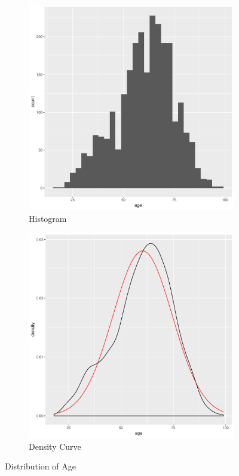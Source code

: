 \documentclass[11pt,openany]{book}
\begin{document}
\begin{figure}
        \centering
        \begin{subfigure}[b]{0.4\textwidth}
                \centering
                \includegraphics[width=\textwidth]{../03_Data/rskhist.pdf}%
                \caption{Histogram}
        \end{subfigure}
        \begin{subfigure}[b]{0.4\textwidth}
                \centering
                \includegraphics[width=\textwidth]{../03_Data/rskden.pdf}%
                \caption{Density Curve}
        \end{subfigure}
                \caption{Distribution of Age 
                \label{fig:rsk_2}} 
                                        
\end{figure}
\end{document}
